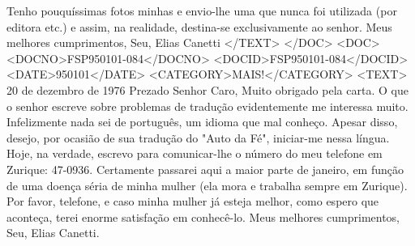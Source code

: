Tenho pouquíssimas fotos minhas e envio-lhe uma que nunca foi utilizada (por editora etc.) e assim, na realidade, destina-se exclusivamente ao senhor.
Meus melhores cumprimentos,
Seu,
Elias Canetti
</TEXT>
</DOC>
<DOC>
<DOCNO>FSP950101-084</DOCNO>
<DOCID>FSP950101-084</DOCID>
<DATE>950101</DATE>
<CATEGORY>MAIS!</CATEGORY>
<TEXT>
20 de dezembro de 1976
Prezado Senhor Caro,
Muito obrigado pela carta. O que o senhor escreve sobre problemas de tradução evidentemente me interessa muito. Infelizmente nada sei de português, um idioma que mal conheço. Apesar disso, desejo, por ocasião de sua tradução do "Auto da Fé", iniciar-me nessa língua.
Hoje, na verdade, escrevo para comunicar-lhe o número do meu telefone em Zurique: 47-0936. Certamente passarei aqui a maior parte de janeiro, em função de uma doença séria de minha mulher (ela mora e trabalha sempre em Zurique). Por favor, telefone, e caso minha mulher já esteja melhor, como espero que aconteça, terei enorme satisfação em conhecê-lo.
Meus melhores cumprimentos,
Seu,
Elias Canetti.


